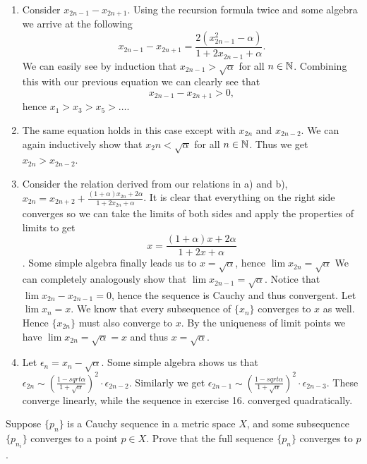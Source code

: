 \begin{solution}
  \begin{enumerate}[label=(\alph*)]
    \item Consider $x_{2n - 1} - x_{2n + 1}$.
      Using the recursion formula twice and some algebra we arrive at the following
      \[x_{2n - 1} - x_{2n + 1} = \frac{2(x_{2n - 1}^2 - \alpha)}{1 + 2x_{2n - 1} + \alpha}.\]
      We can easily see by induction that $x_{2n - 1} > \sqrt{\alpha}$ for all $n \in \mathbb{N}$.
      Combining this with our previous equation we can clearly see that
      \[x_{2n - 1} - x_{2n + 1} > 0,\]
      hence $x_1 > x_3 > x_5 > \ldots$.
    \item The same equation holds in this case except with $x_{2n}$ and $x_{2n - 2}$.
      We can again inductively show that $x_2n < \sqrt{\alpha}$ for all $n \in \mathbb{N}$.
      Thus we get $x_{2n} > x_{2n - 2}$.
    \item Consider the relation derived from our relations in a) and b), $x_{2n} = x_{2n + 2} + \frac{(1 + \alpha)x_{2n} + 2\alpha}{1 + 2x_{2n} + \alpha}$.
      It is clear that everything on the right side converges so we can take the limits of both sides and apply the properties of limits to get
      \[x = \frac{(1 + \alpha)x + 2\alpha}{1 + 2x + \alpha}\].
      Some simple algebra finally leads us to $x = \sqrt{\alpha}$, hence $\lim x_{2n} = \sqrt{\alpha}$
      We can completely analogously show that $\lim x_{2n - 1} = \sqrt{\alpha}$.
      Notice that $\lim x_{2n} - x_{2n - 1} = 0$, hence the sequence is Cauchy and thus convergent.
      Let $\lim x_n = x$.
      We know that every subsequence of $\{x_n\}$ converges to $x$ as well.
      Hence $\{x_{2n}\}$ must also converge to $x$.
      By the uniqueness of limit points we have $\lim x_{2n} = \sqrt{\alpha} = x$ and thus $x = \sqrt{\alpha}$.
    \item Let $\epsilon_n = x_n - \sqrt{\alpha}$.
      Some simple algebra shows us that $\epsilon_{2n} \sim (\frac{1 - sqrt{\alpha}}{1 + \sqrt{\alpha}})^2 \cdot \epsilon_{2n - 2}$.
      Similarly we get $\epsilon_{2n - 1} \sim (\frac{1 - sqrt{\alpha}}{1 + \sqrt{\alpha}})^2 \cdot \epsilon_{2n - 3}$.
      These converge linearly, while the sequence in exercise 16. converged quadratically.
  \end{enumerate}
\end{solution}

\setcounter{problem}{19}
\begin{problem}
  Suppose $\{p_n\}$ is a Cauchy sequence in a metric space $X$, and some subsequence $\{p_{n_i}\}$ converges to a point $p \in X$.
  Prove that the full sequence $\{p_n\}$ converges to $p$.
\end{problem}

